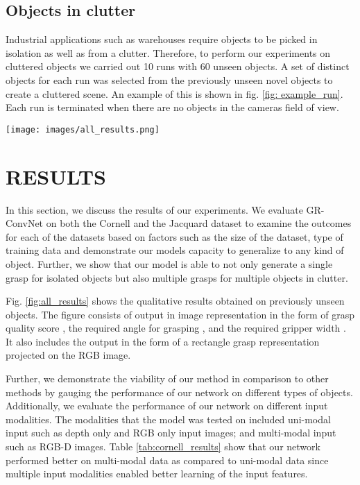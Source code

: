 \documentclass[letterpaper, 10 pt, conference]{ieeeconf}
\begin{document}
\subsection{Objects in clutter}
Industrial applications such as warehouses require objects to be picked in isolation as well as from a clutter. Therefore, to perform our experiments on cluttered objects we carried out 10 runs with 60 unseen objects. A set of distinct objects for each run was selected from the previously unseen novel objects to create a cluttered scene. An example of this is shown in fig. \ref{fig: example_run}. Each run is terminated when there are no objects in the camera\textquotesingle s field of view. 



\begin{figure*}
    \centering
    \texttt{[image: images/all\_results.png]}  
    \caption{Qualitative results. Quality, angle and width are the output of GR-ConNet which are used to infer grasp rectangle. (a) Unseen objects from Cornell dataset (b) Unseen objects from Jacquard dataset (c) Single household object (d) Multiple grasps for multiple objects (e) Poor grasp for transparent object}
    \label{fig:all_results}
\end{figure*}

\section{RESULTS} \label{results}
In this section, we discuss the results of our experiments. We evaluate GR-ConvNet on both the Cornell and the Jacquard dataset to examine the outcomes for each of the datasets based on factors such as the size of the dataset, type of training data and demonstrate our model\textquotesingle s capacity to generalize to any kind of object. Further, we show that our model is able to not only generate a single grasp for isolated objects but also multiple grasps for multiple objects in clutter.

Fig. \ref{fig:all_results} shows the qualitative results obtained on previously unseen objects. The figure consists of output in image representation  in the form of grasp quality score , the required angle for grasping , and the required gripper width . It also includes the output in the form of a rectangle grasp representation projected on the RGB image.



Further, we demonstrate the viability of our method in comparison to other methods by gauging the performance of our network on different types of objects. Additionally, we evaluate the performance of our network on different input modalities. The modalities that the model was tested on included uni-modal input such as depth only and RGB only input images; and multi-modal input such as RGB-D images. Table \ref{tab:cornell_results} show that our network performed better on multi-modal data as compared to uni-modal data since multiple input modalities enabled better learning of the input features.
\end{document}
